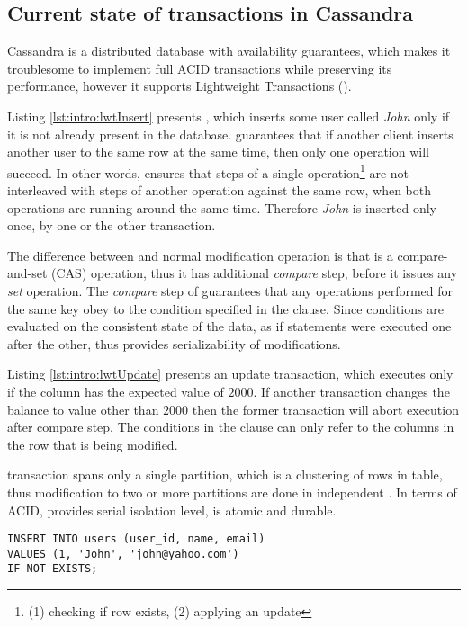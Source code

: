 \subsection{Current state of transactions in Cassandra}	
Cassandra is a distributed database with availability guarantees, which makes it troublesome to implement full ACID transactions while preserving its performance, however it supports Lightweight Transactions (\lwt).

Listing \ref{lst:intro:lwtInsert} presents \lwt, which inserts some user called \emph{John} only if it is not already present in the database. \lwt  guarantees that if another client inserts another user to the same row at the same time, then only one operation will succeed. In other words, \lwt ensures that steps of a single operation\footnote{(1) checking if row exists, (2) applying an update} are not interleaved with steps of another operation against the same row, when both operations are running around the same time. Therefore \emph{John} is inserted only once, by one or the other transaction.

The difference between \lwt and normal modification operation is that \lwt is a compare-and-set (CAS) operation, thus it has additional \emph{compare} step, before it issues any \emph{set} operation.
The \emph{compare} step of \lwt guarantees that any operations performed for the same key obey to the condition specified in the  clause. Since conditions are evaluated on the consistent state of the data, as if statements were executed one after the other, thus provides serializability of modifications.

Listing \ref{lst:intro:lwtUpdate} presents an update transaction, which executes only if the  column has the expected value of $2000$. If another transaction changes the balance to value other than $2000$ then the former transaction will abort execution after compare step. The conditions in the  clause can only refer to the columns in the row that is being modified.

\lwt transaction spans only a single partition, which is a clustering of rows in  table, thus modification to two or more partitions are done in independent \lwt. In terms of ACID, \lwt provides serial isolation level, is atomic and durable. 

\begin{example}
\label{lst:intro:lwtInsert}
\begin{lstlisting}[style=outcode,caption={LWT Insert with \code{IF NOT EXISTS} clause}]
INSERT INTO users (user_id, name, email)  
VALUES (1, 'John', 'john@yahoo.com') 
IF NOT EXISTS;
\end{lstlisting}
\end{example}

